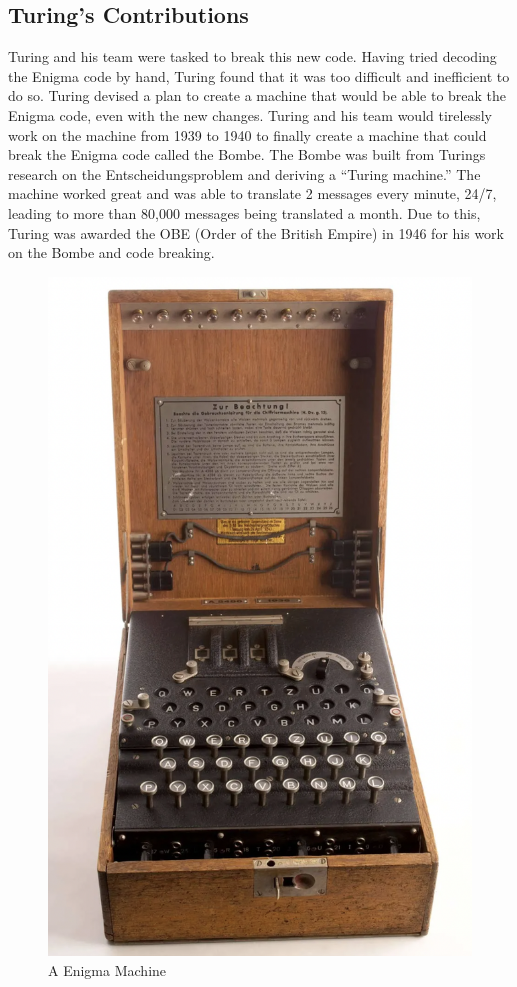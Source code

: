 \documentclass[12pt]{article}
\begin{document}
\subsection*{Turing's Contributions}
Turing and his team were tasked to break this new code.
Having tried decoding the Enigma code by hand, Turing found that it was too difficult and inefficient to do so.
Turing devised a plan to create a machine that would be able to break the Enigma code, even with the new changes.
Turing and his team would tirelessly work on the machine from 1939 to 1940 to finally create a machine that could break
the Enigma code called the Bombe. The Bombe was built from Turings research on the Entscheidungsproblem and 
deriving a ``Turing machine.'' The machine worked great and was able to translate
2 messages every minute, 24/7, leading to more than 80,000 messages being translated a month.
Due to this, Turing was awarded the OBE (Order of the British Empire) in 1946 for his work on the Bombe and code breaking.

\begin{figure}[h]
    \centering
    \includegraphics[scale=.3]{images/Enigma.png}
    \caption{A Enigma Machine}
\end{figure}
\end{document}
